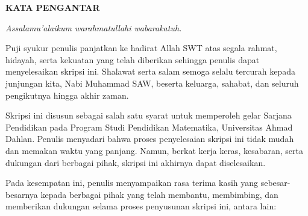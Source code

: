 \begin{center}
    \textbf{KATA PENGANTAR}
\end{center}

\vspace{1cm}

\begin{center}
    \textit{Assalamu'alaikum warahmatullahi wabarakatuh.}
\end{center}

\vspace{0.5cm}

\hspace*{1cm}Puji syukur penulis panjatkan ke hadirat Allah SWT atas segala rahmat, hidayah, serta kekuatan yang telah diberikan sehingga penulis dapat menyelesaikan skripsi ini. Shalawat serta salam semoga selalu tercurah kepada junjungan kita, Nabi Muhammad SAW, beserta keluarga, sahabat, dan seluruh pengikutnya hingga akhir zaman.

\hspace*{1cm}Skripsi ini disusun sebagai salah satu syarat untuk memperoleh gelar Sarjana Pendidikan pada Program Studi Pendidikan Matematika, Universitas Ahmad Dahlan. Penulis menyadari bahwa proses penyelesaian skripsi ini tidak mudah dan memakan waktu yang panjang. Namun, berkat kerja keras, kesabaran, serta dukungan dari berbagai pihak, skripsi ini akhirnya dapat diselesaikan.

\hspace*{1cm}Pada kesempatan ini, penulis menyampaikan rasa terima kasih yang sebesar-besarnya kepada berbagai pihak yang telah membantu, membimbing, dan memberikan dukungan selama proses penyusunan skripsi ini, antara lain:

